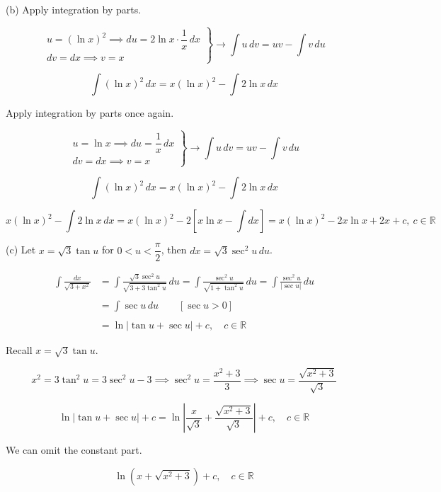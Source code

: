 \documentclass{article}
\begin{document}
\hfill

\noindent (b) Apply integration by parts.

\[\left.\begin{array}{c}
u=(\ln x)^2\implies du=2\ln x\cdot\dfrac1x\,dx\\
dv=dx\implies v=x
\end{array}\right\}\rightarrow \int u\,dv=uv-\int v\,du\]

\[\int(\ln x)^2\,dx=x(\ln x)^2-\int2\ln x\,dx\]

\hfill

\noindent Apply integration by parts once again.

\[\left.\begin{array}{c}
u=\ln x\implies du=\dfrac1x\,dx\\
dv=dx\implies v=x
\end{array}\right\}\rightarrow \int u\,dv=uv-\int v\,du\]

\[\int(\ln x)^2\,dx=x(\ln x)^2-\int2\ln x\,dx\]

\[x(\ln x)^2-\int2\ln x\,dx=x(\ln x)^2-2\left[x\ln x-\int dx\right]=\boxed{x(\ln x)^2-2x\ln x+2x+c,\: c\in\mathbb{R}}\]

\hfill

\noindent (c) Let $x=\sqrt3\tan u$ for $0<u<\dfrac\pi2$, then $dx=\sqrt3\sec^2u\,du$.

\begin{align*}\int\frac{dx}{\sqrt{3+x^2}}&=\int\frac{\sqrt3\sec^2u}{\sqrt{3+3\tan^2u}}\,du=\int\frac{\sec^2u}{\sqrt{1+\tan^2u}}\,du=\int\frac{\sec^2u}{\left|\sec u\right|}\,du\\\\&=\int\sec u\,du\qquad\left[\sec u>0\right]\\\\&=\ln\left|\tan u+\sec u\right|+c,\quad c\in\mathbb{R}\end{align*}

\hfill

\noindent Recall $x=\sqrt3\tan u$.

\[x^2=3\tan^2u=3\sec^2u-3\implies \sec^2u=\frac{x^2+3}3\implies\sec u=\frac{\sqrt{x^2+3}}{\sqrt3}\]

\[\ln\left|\tan u+\sec u\right|+c=\boxed{\ln\left|\frac{x}{\sqrt3}+\frac{\sqrt{x^2+3}}{\sqrt3}\right|+c,\quad c\in\mathbb{R}}\]

\noindent We can omit the constant part.

\[\boxed{\ln\left(x+\sqrt{x^2+3}\right)+c,\quad c\in\mathbb{R}}\]

\hfill
\end{document}
